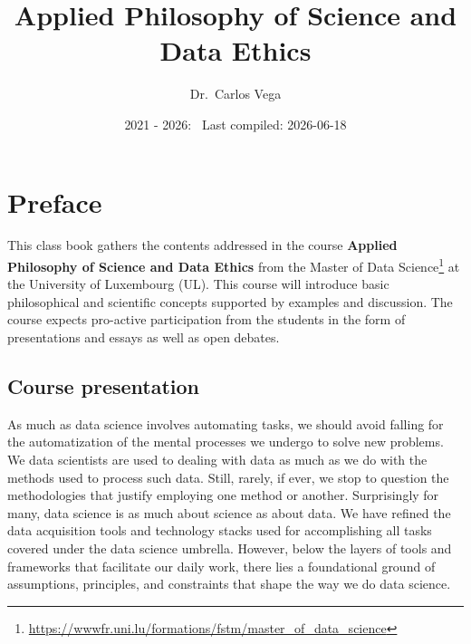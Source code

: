 \documentclass[
  12pt,
]{book}
\title{Applied Philosophy of Science and Data Ethics}
\author{Dr.~Carlos Vega}
\date{2021 - 2026: ~Last compiled: 2026-06-18}
\let\oldmaketitle\maketitle
\DeclareRobustCommand{\href}[2]{#2\footnote{\url{#1}}}
\begin{document}
\maketitle

\thispagestyle{empty}

\thispagestyle{empty}
\let\maketitle\oldmaketitle
\maketitle
\thispagestyle{empty}

{
\hypersetup{linkcolor=}
\setcounter{tocdepth}{3}
\tableofcontents
}
\chapter*{Preface}\label{preface}


This class book gathers the contents addressed in the course \textbf{Applied Philosophy of Science and Data Ethics} from the \href{https://wwwfr.uni.lu/formations/fstm/master_of_data_science}{Master of Data Science} at the University of Luxembourg (UL). This course will introduce basic philosophical and scientific concepts supported by examples and discussion. The course expects pro-active participation from the students in the form of presentations and essays as well as open debates.

\section*{Course presentation}\label{course-presentation}

As much as data science involves automating tasks, we should avoid falling for the automatization of the mental processes we undergo to solve new problems. We data scientists are used to dealing with data as much as we do with the methods used to process such data. Still, rarely, if ever, we stop to question the methodologies that justify employing one method or another. Surprisingly for many, data science is as much about science as about data. We have refined the data acquisition tools and technology stacks used for accomplishing all tasks covered under the data science umbrella. However, below the layers of tools and frameworks that facilitate our daily work, there lies a foundational ground of assumptions, principles, and constraints that shape the way we do data science.
\end{document}
